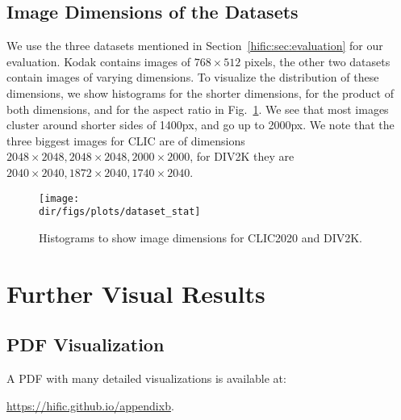 \begin{subappendices}
\subsection{Image Dimensions of the Datasets}  \label{hific:sec:supp:dataset}
We use the three datasets mentioned in Section~\ref{hific:sec:evaluation} for our evaluation. Kodak contains images of $768{\times}512$ pixels, the other two datasets contain images of varying dimensions. To visualize the distribution of these dimensions, we show histograms for the shorter dimensions, for the product of both dimensions, and for the aspect ratio in Fig.~\ref{hific:fig:dataset_stat}.
We see that most images cluster around shorter sides of 1400px, and go up to 2000px. We note that the three biggest images for CLIC are of dimensions $2048{\times}2048, 2048{\times}2048, 2000{\times}2000$, for DIV2K they are $2040{\times}2040, 1872{\times}2040, 1740{\times}2040$.
\begin{figure}[hb]
    \centering
    \texttt{[image: \\dir/figs/plots/dataset\_stat]}
    \caption{\label{hific:fig:dataset_stat}Histograms to show image dimensions for CLIC2020 and DIV2K.}
\end{figure}

\FloatBarrier
\clearpage

%                    
%                                                      

\section{Further Visual Results} \label{hific:sec:supp:morevisuals}

\subsection{PDF Visualization}

A PDF with many detailed visualizations is available at:

\url{https://hific.github.io/appendixb}.
                      

\end{subappendices}
